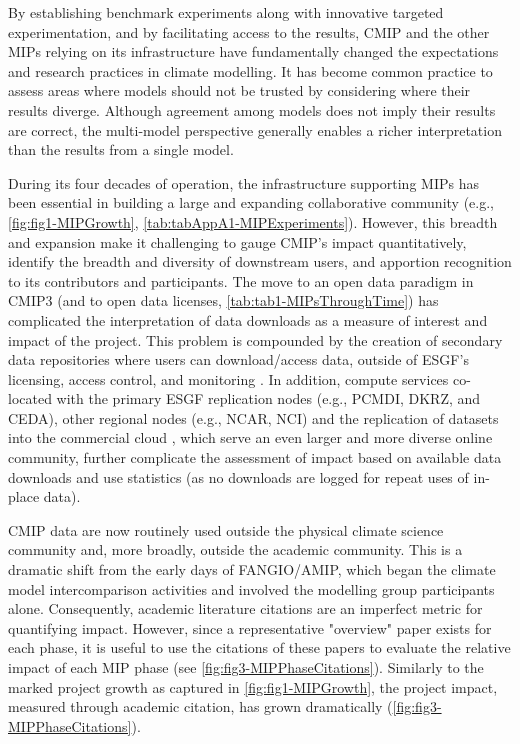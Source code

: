 \documentclass[manuscript]{copernicus}
\begin{document}
By establishing benchmark experiments along with innovative targeted experimentation, and by facilitating access to the results, CMIP and the other MIPs relying on its infrastructure have fundamentally changed the expectations and research practices in climate modelling. It has become common practice to assess areas where models should not be trusted by considering where their results diverge. Although agreement among models does not imply their results are correct, the multi-model perspective generally enables a richer interpretation than the results from a single model.  

During its four decades of operation, the infrastructure supporting MIPs has been essential in building a large and expanding collaborative community (e.g., \autoref{fig:fig1-MIPGrowth}, \autoref{tab:tabAppA1-MIPExperiments}). However, this breadth and expansion make it challenging to gauge CMIP's impact quantitatively, identify the breadth and diversity of downstream users, and apportion recognition to its contributors and participants. The move to an open data paradigm in CMIP3 (and to open data licenses, \autoref{tab:tab1-MIPsThroughTime}) has complicated the interpretation of data downloads as a measure of interest and impact of the project. This problem is compounded by the creation of secondary data repositories where users can download/access data, outside of ESGF's licensing, access control, and monitoring \citep[e.g.,][]{balaji_requirements_2018}. In addition, compute services co-located with the primary ESGF replication nodes (e.g., PCMDI, DKRZ, and CEDA), other regional nodes (e.g., NCAR, NCI) and the replication of datasets into the commercial cloud \citep[e.g., PANGEO;][]{abernathey_cmip6_2020}, which serve an even larger and more diverse online community, further complicate the assessment of impact based on available data downloads and use statistics (as no downloads are logged for repeat uses of in-place data).

CMIP data are now routinely used outside the physical climate science community and, more broadly, outside the academic community. This is a dramatic shift from the early days of FANGIO/AMIP, which began the climate model intercomparison activities and involved the modelling group participants alone. Consequently, academic literature citations are an imperfect metric for quantifying impact. However, since a representative "overview" paper exists for each phase, it is useful to use the citations of these papers to evaluate the relative impact of each MIP phase (see \autoref{fig:fig3-MIPPhaseCitations}). Similarly to the marked project growth as captured in \autoref{fig:fig1-MIPGrowth}, the project impact, measured through academic citation, has grown dramatically (\autoref{fig:fig3-MIPPhaseCitations}).
\end{document}
